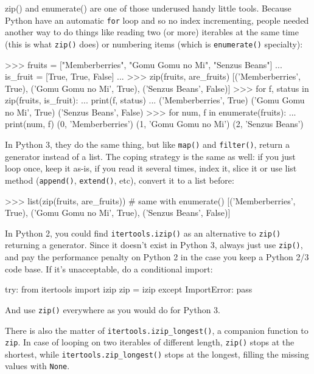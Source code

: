 {zip()} and enumerate() are one of those underused handy little tools. Because Python have an automatic \lstinline{for} loop and so no index incrementing, people needed another way to do things like reading two (or more) \glspl{iterable} at the same time (this is what \lstinline{zip()} does) or numbering items (which is \lstinline{enumerate()} specialty):

\begin{py2}
>>> fruits = ["Memberberries", "Gomu Gomu no Mi", "Senzus Beans"]
... is_fruit = [True, True, False]
...
>>> zip(fruits, are_fruits)
[('Memberberries', True), ('Gomu Gomu no Mi', True), ('Senzus Beans', False)]
>>> for f, status in zip(fruits, is_fruit):
...     print(f, status)
...
('Memberberries', True)
('Gomu Gomu no Mi', True)
('Senzus Beans', False)
>>> for num, f in enumerate(fruits):
...     print(num, f)
(0, 'Memberberries')
(1, 'Gomu Gomu no Mi')
(2, 'Senzus Beans')
\end{py2}

In Python 3, they do the same thing, but like \lstinline{map()} and \lstinline{filter()}, return a generator instead of a list. The coping strategy is the same as well: if you just loop once, keep it as-is, if you read it several times, index it, slice it or use list method (\lstinline{append()}, \lstinline{extend()}, etc), convert it to a list before:

\begin{py2and3}
>>> list(zip(fruits, are_fruits)) # same with enumerate()
[('Memberberries', True), ('Gomu Gomu no Mi', True), ('Senzus Beans', False)]
\end{py2and3}

In Python 2, you could find \lstinline{itertools.izip()} as an alternative to \lstinline{zip()} returning a generator. Since it doesn't exist in Python 3, always just use \lstinline{zip()}, and pay the performance penalty on Python 2 in the case you keep a Python 2/3 code base. If it's unacceptable, do a conditional import:

\begin{py2and3}
try:
    from itertools import izip
    zip = izip
except ImportError:
    pass
\end{py2and3}

And use \lstinline{zip()} everywhere as you would do for Python 3.

There is also the matter of \lstinline{itertools.izip_longest()}, a companion function to \lstinline{zip}. In case of looping on two iterables of different length, \lstinline{zip()} stops at the shortest, while \lstinline{itertools.zip_longest()} stops at the longest, filling the missing values with \lstinline{None}.

